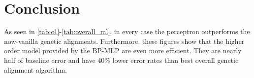 \section {Conclusion}
\label{conclusion}

As seen in \ref{tab:c1}-\ref{tab:overall_ml}, in every case the perceptron outperforms the now-vanilla genetic alignments. Furthermore, these figures show that the higher order model provided by the BP-MLP are even more efficient. They are nearly half of baseline error and have 40\% lower error rates than best overall genetic alignment algorithm.



